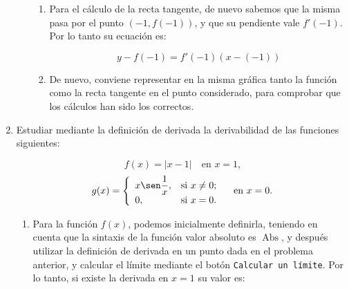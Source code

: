 \begin{enumerate}[leftmargin=*]
\begin{enumerate}
\begin{indication}
{\begin{enumerate}
\[
f'(a) = \mathop {\lim }\limits_{h \to 0} \frac{{f(a + h) - f(a)}}
{h}
\]
en donde, por aligerar la notación, hemos llamado $h$ a lo que en
la teoría denominábamos $\Delta x$.

Por lo tanto, para calcular la derivada de la función $f$ en
$a=-1$ mediante la definición, procedemos con:

\[
f'(-1) = \mathop {\lim }\limits_{h \to 0} \frac{{f(-1 + h) -
f(-1)}} {h}
\]

Para calcular el límite, podemos utilizar el botón
\texttt{Calcular un límite} de la barra de botones.

\item Para el cálculo de la recta tangente, de nuevo sabemos que
la misma pasa por el punto $(-1, f(-1))$, y que su pendiente vale
$f'(-1)$. Por lo tanto su ecuación es:

\[
y - f( - 1) = f'(-1)\left( {x - ( - 1)} \right)
\]

\item De nuevo, conviene representar en la misma gráfica tanto la
función como la recta tangente en el punto considerado, para
comprobar que los cálculos han sido los correctos.

\end{enumerate}
}
\end{indication}


\end{enumerate}




\item Estudiar mediante la definición de derivada la derivabilidad
de las funciones siguientes:


\[
f(x)=|x-1| \quad \textrm{en $x=1$,}
\]
\[
g(x)=\left\{%
\begin{array}{ll}
   x \sen\dfrac{1}{x}, & \hbox{si $x\neq 0$;} \\
   0, & \hbox{si $x=0$.} \\
\end{array}%
\right. \quad \textrm{en $x=0$.}
\]

\begin{indication}
{
\begin{enumerate}
\item Para la función $f(x)$, podemos inicialmente definirla,
teniendo en cuenta que la sintaxis de la función valor absoluto es
$\operatorname{Abs}$, y después utilizar la definición de derivada
en un punto dada en el problema anterior, y calcular el límite
mediante el botón \texttt{Calcular un límite}. Por lo tanto, si
existe la derivada en $x=1$ su valor es:



\end{enumerate}}
\end{indication}
\end{enumerate}
